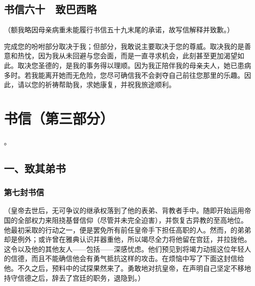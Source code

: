 
\subsection{书信六十　致巴西略}

（额我略因母亲病重未能履行书信五十九末尾的承诺，故写信解释并致歉。）\par

完成您的吩咐部分取决于我；但部分，我敢说主要取决于您的尊威。取决我的是善意和热忱，因为我从未回避与您会面，而是一直寻求机会，此刻甚至更加渴望如此。取决您圣德的，是我的事务得以理顺。因为我正陪伴我的母亲夫人，她已患病多时。若我能离开她而无危险，您尽可确信我不会剥夺自己前往您那里的乐趣。因此，请以您的祈祷帮助我，求她康复，并祝我旅途顺利。\par



\section{书信（第三部分）}

。\par


\subsection{一、致其弟书}


\subsubsection{第七封书信}

（皇帝去世后，无可争议的继承权落到了他的表弟、背教者手中。随即开始运用帝国的全部权力来阻挠基督信仰（尽管并未完全迫害），并恢复古异教的至高地位。他最初采取的行动之一，便是罢免所有前任皇帝手下担任高职的人。然而，的弟弟却是例外；或许曾在雅典认识并器重他，所以竭尽全力将他留在宫廷，并拉拢他。这令以及他的其他友人——包括——深感忧虑。他们预见到将竭力动摇这位年轻人的信德，而且不能确信他会有勇气抵抗这样的攻击。在烦恼中写了下面这封信给他。不久之后，预料中的试探果然来了。勇敢地对抗皇帝，在声明自己坚定不移地持守信德之后，辞去了宫廷的职务，退隐到。）\par

